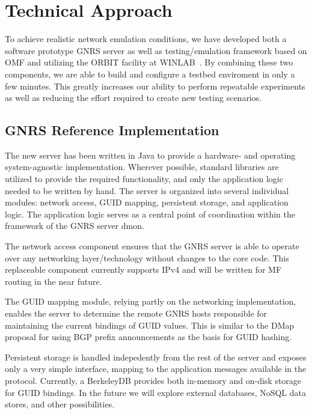 \documentclass[10pt]{article}
\begin{document}
\section{Technical Approach}
To achieve realistic network emulation conditions, we have developed both a
software prototype GNRS server as well as testing/emulation framework based on
OMF and utilizing the ORBIT facility at WINLAB~\cite{orbit}.  By combining
these two components, we are able to build and configure a testbed enviroment
in only a few minutes.  This greatly increases our ability to perform
repeatable experiments as well as reducing the effort required to create new
testing scenarios.


\subsection{GNRS Reference Implementation}
The new server has been written in Java to provide a hardware- and operating
system-agnostic implementation.  Wherever possible, standard libraries are
utilized to provide the required functionality, and only the application logic
needed to be written by hand.  The server is organized into several individual
modules: network access, GUID mapping, persistent storage, and application
logic.  The application logic serves as a central point of coordination within
the framework of the GNRS server dmon.

The network access component ensures that the GNRS server is able to operate
over any networking layer/technology without changes to the core code.  This
replaceable component currently supports IPv4 and will be written for MF
routing in the near future.

The GUID mapping module, relying partly on the networking implementation,
enables the server to determine the remote GNRS hosts responsible for
maintaining the current bindings of GUID values.  This is similar to the DMap
proposal for using BGP prefix announcements as the basis for GUID hashing.

Persistent storage is handled indepedently from the rest of the server and
exposes only a very simple interface, mapping to the application messages
available in the protocol.  Currently, a BerkeleyDB provides both in-memory
and on-disk storage for GUID bindings.  In the future we will explore external
databases, NoSQL data stores, and other possibilities.
\end{document}
